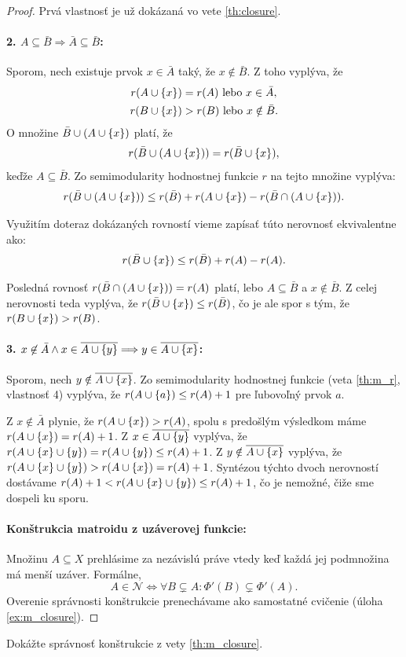 \begin{proof}
Prvá vlastnosť je už dokázaná vo vete \ref{th:closure}.
\paragraph{2. $A \subseteq \bar{B} \Longrightarrow \bar{A} \subseteq \bar{B}$:}
Sporom, nech existuje prvok $x \in \bar{A}$ taký, že $x \notin \bar{B}$. Z toho vyplýva, že
\begin{align*}
	r(A\cup\left\{x\right\})&=r(A) \text{ lebo } x\in\bar{A}, \\
	r(B\cup\left\{x\right\})&>r(B) \text{ lebo } x\notin\bar{B}.\label{rb-rbx-unequality}
\end{align*}
O množine $\bar{B}\cup(A\cup\left\{x\right\})$ platí, že
$$r(\bar{B}\cup(A\cup\left\{x\right\}))=r(\bar{B}\cup\left\{x\right\}),$$
keďže $A\subseteq \bar{B}$. Zo semimodularity hodnostnej funkcie $r$ na tejto množine vyplýva:
$$r(\bar{B}\cup(A\cup\left\{x\right\}))\leq r(\bar{B})+r(A\cup\left\{x\right\})-r(\bar{B}\cap(A\cup\left\{x\right\})).$$

Využitím doteraz dokázaných rovností vieme zapísať túto nerovnosť ekvivalentne ako:
\begin{align*}
	r(\bar{B}\cup\left\{x\right\})\leq r(\bar{B})+r(A)-r(A).
\end{align*}

Posledná rovnosť $r(\bar{B}\cap(A\cup\left\{x\right\}))=r(A)$ platí, lebo $A\subseteq \bar{B}$ a $x\notin\bar{B}$. Z celej nerovnosti teda vyplýva, že $r(\bar{B}\cup\left\{x\right\})\leq r(\bar{B})$, čo je ale spor s tým, že ${r(B\cup\left\{x\right\})>r(B)}$.
\paragraph{3. $x \not\in \bar{A} \wedge x \in \overline{A \cup \left\{y\right\}} \Longrightarrow y \in \overline{A \cup \left\{x\right\}}$:}
Sporom, nech $y \notin\overline{A \cup \left\{x\right\}}$.
Zo semimodularity hodnostnej funkcie (veta \ref{th:m_r}, vlastnosť 4) vyplýva, že $r(A \cup \left\{a\right\}) \leq r(A) + 1$ pre ľubovoľný prvok $a$.

Z $x \not\in \bar{A}$ plynie, že $r(A \cup \left\{x\right\}) > r(A)$, spolu s predošlým výsledkom máme $r(A \cup \left\{x\right\}) = r(A) + 1$.
Z $x \in \overline{A \cup \left\{y\right\}}$ vyplýva, že $r(A \cup \left\{x\right\} \cup \left\{y\right\}) = r(A \cup \left\{y\right\}) \leq r(A) + 1$.
Z $y \notin\overline{A \cup \left\{x\right\}}$ vyplýva, že $r(A \cup \left\{x\right\} \cup \left\{y\right\}) > r(A \cup \left\{x\right\}) = r(A) + 1$.
Syntézou týchto dvoch nerovností dostávame $r(A) + 1 < r(A \cup \left\{x\right\} \cup \left\{y\right\}) \leq r(A) + 1$, čo je nemožné, čiže sme dospeli ku sporu.
\paragraph{Konštrukcia matroidu z uzáverovej funkcie:}
Množinu $A \subseteq X$ prehlásime za nezávislú práve vtedy keď každá jej podmnožina má menší uzáver.
Formálne, $$A \in \mathcal{N} \Longleftrightarrow \forall B \subsetneq A: \Phi'(B) \subsetneq \Phi'(A).$$
Overenie správnosti konštrukcie prenechávame ako samostatné cvičenie (úloha \ref{ex:m_closure}).
\end{proof}
\begin{exercise}
\label{ex:m_closure}
Dokážte správnosť konštrukcie z vety \ref{th:m_closure}.
\end{exercise}

